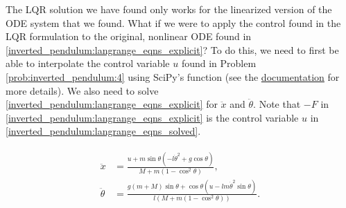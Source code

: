 The LQR solution we have found only works for the linearized version of the ODE system that we found. What if we were to apply the control found in the LQR formulation to the original, nonlinear ODE found in \eqref{inverted_pendulum:langrange_eqns_explicit}?
To do this, we need to first be able to interpolate the control variable $u$ found in Problem \ref{prob:inverted_pendulum:4} using SciPy's  function (see the \href{https://docs.scipy.org/doc/scipy/reference/generated/scipy.interpolate.CubicSpline.html}{documentation} for more details).
We also need to solve \eqref{inverted_pendulum:langrange_eqns_explicit} for $\ddot x$ and $\ddot \theta$. Note that $-F$ in \eqref{inverted_pendulum:langrange_eqns_explicit} is the control variable $u$ in \eqref{inverted_pendulum:langrange_eqns_solved}.


\begin{align}
	\begin{split}
		\ddot x &= \frac{u+m\sin\theta(-l\dot \theta^2+g\cos\theta)}{M+m(1-\cos^2\theta)},\\
		\ddot{\theta} &= \frac{g(m+M)\sin\theta+\cos\theta(u-lm\dot\theta^2\sin\theta)}{l(M+m(1-\cos^2\theta))}.
	\end{split}\label{inverted_pendulum:langrange_eqns_solved}
\end{align}

